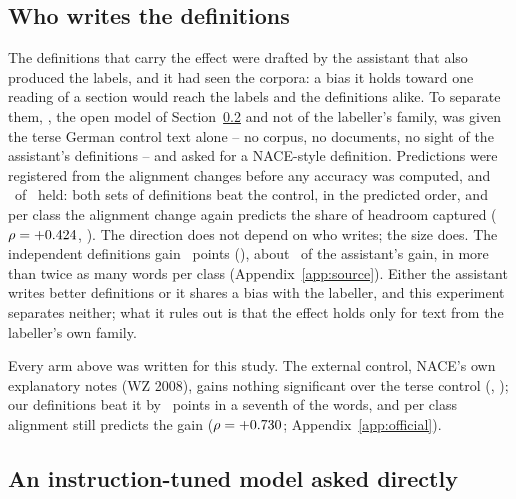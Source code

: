 \documentclass[11pt]{article}
\begin{document}
\subsection{Who writes the definitions}
\label{sec:source}

The definitions that carry the effect were drafted by the assistant that also
produced the labels, and it had seen the corpora: a bias it holds toward one
reading of a section would reach the labels and the definitions alike. To
separate them, \SourceWriter, the open model of Section~\ref{sec:llm} and not
of the labeller's family, was given the terse German control text alone -- no
corpus, no documents, no sight of the assistant's definitions -- and asked for a
NACE-style definition. Predictions were registered from the alignment changes
before any accuracy was computed, and \SourceHeld\ of \SourcePredictions\
held: both sets of definitions beat the control, in the predicted order, and
per class the alignment change again predicts the share of headroom captured
($\rho = +0.424$, \SourceRhoPStat). The direction does not depend on who
writes; the size does. The independent definitions gain
\SourceWriterGain~points (\SourceWriterPStat), about \SourceWriterShare\ of
the assistant's gain, in more than twice as many words per class
(Appendix~\ref{app:source}). Either the assistant writes better definitions or
it shares a bias with the labeller, and this experiment separates neither; what
it rules out is that the effect holds only for text from the labeller's own
family.

Every arm above was written for this study. The external control, NACE's own
explanatory notes (WZ 2008), gains nothing significant over the terse control
(\OfficialFullGain, \OfficialFullPStat); our definitions beat it by
\OfficialAssistantOverFull~points in a seventh of the words, and per class
alignment still predicts the gain ($\rho = +0.730$;
Appendix~\ref{app:official}).

\subsection{An instruction-tuned model asked directly}
\label{sec:llm}
\end{document}
